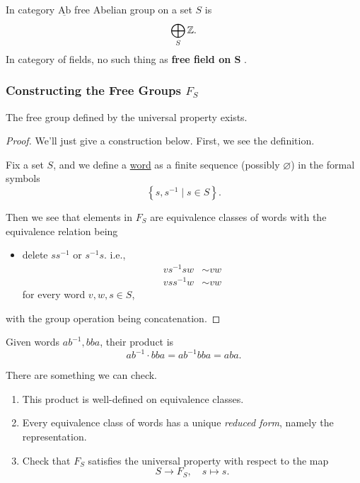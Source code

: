 \begin{eg}
	In category \(\underline{\mathrm{Ab}}\) free Abelian group on a set \(S\) is
	\[
		\bigoplus_S \mathbb{\MakeUppercase{z}}.
	\]
	In category of fields, no such thing as \textbf{free field on \(\bm{S} \) }.
\end{eg}

\subsubsection{Constructing the Free Groups \(F_S\)}
\begin{proposition}
	The free group defined by the universal property exists.
\end{proposition}
\begin{proof}
	We'll just give a construction below. First, we see the definition.
	\begin{definition}
		Fix a set \(S\), and we define a \underline{word} as a finite sequence (possibly \(\varnothing \))
		in the formal symbols
		\[
			\left\{s, s ^{-1} \mid s\in S\right\}.
		\]
	\end{definition}

	Then we see that elements in \(F_S\) are equivalence classes of words with the equivalence relation being
	\begin{itemize}
		\item delete \(s s ^{-1} \) or \(s ^{-1} s\). i.e.,
		      \[
			      \begin{split}
				      vs ^{-1} s w&\sim vw\\
				      v s s ^{-1}  w &\sim vw
			      \end{split}
		      \]
		      for every word \(v, w, s\in S\),
	\end{itemize}
	with the group operation being concatenation.
\end{proof}

\begin{eg}
	Given words \(ab^{-1} , bba\), their product is
	\[
		ab^{-1} \cdot bba = ab^{-1}  bb a = aba.
	\]
\end{eg}

\begin{exercise}
	There are something we can check.
	\begin{enumerate}
		\item This product is well-defined on equivalence classes.
		\item Every equivalence class of words has a unique \emph{reduced form}, namely the representation.
		\item Check that \(F_S\) satisfies the universal property with respect to the map
		      \[
			      S\to F_S,\quad s\mapsto s.
		      \]
	\end{enumerate}
\end{exercise}

